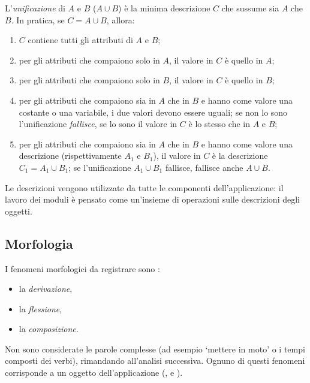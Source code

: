 \documentclass[twoside,stylearticle,11pt,filologia,it,article,bibsection]{spinoza}
\newcommand\spzmunify{\cup}
\begin{document}
L'{\it unificazione} di $A$ e $B$ ($A\spzmunify B$) è la minima descrizione
$C$ che sussume sia $A$ che $B$. In pratica, se $C=A\spzmunify B$, allora:
\begin{enumerate}
\item $C$ contiene tutti gli attributi di $A$ e $B$;
\item per gli attributi che compaiono solo in $A$, il valore in $C$ è
  quello in $A$;
\item per gli attributi che compaiono solo in $B$, il valore in $C$ è
  quello in $B$;
\item per gli attributi che compaiono sia in $A$ che in $B$ e hanno
  come valore una costante o una variabile, i due valori devono essere
  uguali; se non lo sono l'unificazione {\it fallisce}, se lo sono il
  valore in $C$ è lo stesso che in $A$ e $B$;
\item per gli attributi che compaiono sia in $A$ che in $B$ e hanno
  come valore una descrizione (rispettivamente $A_1$ e $B_1$), il
  valore in $C$ è la descrizione $C_1=A_1\spzmunify B_1$; se l'unificazione
  $A_1\spzmunify B_1$ fallisce, fallisce anche $A\spzmunify B$.
\end{enumerate}

Le descrizioni vengono utilizzate da tutte le componenti
dell'applicazione: il lavoro dei moduli è pensato come un'insieme di
operazioni sulle descrizioni degli oggetti.

\subsection{Morfologia}

I fenomeni morfologici da registrare sono :
\begin{itemize}
\item la {\it derivazione},
\item la {\it flessione}, 
\item la {\it composizione}.
\end{itemize}

Non sono considerate le parole complesse (ad esempio `mettere in moto'
o i tempi composti dei verbi), rimandando all'analisi
successiva. Ognuno di questi fenomeni corrisponde a un oggetto
dell'applicazione (\vedi {},
 e ).
\end{document}
